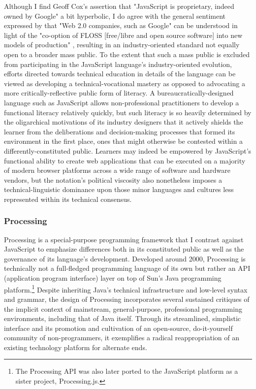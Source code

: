 Although I find Geoff Cox's assertion that "JavaScript is proprietary, indeed owned by Google" \autocite*[83]{Cox2012} a bit hyperbolic, I do agree with the general sentiment expressed by \citeauthor{Berry2008} that "Web 2.0 companies, such as Google" can be understood in light of the "co-option of FLOSS [free/libre and open source software] into new models of production" \autocite[xiii]{Berry2008}, resulting in an industry-oriented standard not equally open to a broader mass public. To the extent that such a mass public is excluded from participating in the JavaScript language's industry-oriented evolution, efforts directed towards technical education in details of the language can be viewed as developing a technical-vocational mastery as opposed to advocating a more critically-reflective public form of literacy. A bureaucratically-designed language such as JavaScript allows non-professional practitioners to develop a functional literacy relatively quickly, but such literacy is so heavily determined by the oligarchical motivations of its industry designers that it actively shields the learner from the deliberations and decision-making processes that formed its environment in the first place, ones that might otherwise be contested within a differently-constituted public. Learners may indeed be empowered by JavaScript's functional ability to create web applications that can be executed on a majority of modern browser platforms across a wide range of software and hardware vendors, but the notation's political viscosity also nonetheless imposes a technical-linguistic dominance upon those minor languages and cultures less represented within its technical consensus.

\subsubsection*{Processing}
Processing is a special-purpose programming framework that I contrast against JavaScript to emphasize differences both in its constituted public as well as the governance of its language's development. Developed around 2000, Processing is technically not a full-fledged programming language of its own but rather an API (application program interface) layer on top of Sun's Java programming platform.\footnote{
  The Processing API was also later ported to the JavaScript platform as a sister project, Processing.js.
}
Despite inheriting Java's technical infrastructure and low-level syntax and grammar, the design of Processing incorporates several sustained critiques of the implicit context of mainstream, general-purpose, professional programming environments, including that of Java itself. Through its streamlined, simplistic interface and its promotion and cultivation of an open-source, do-it-yourself community of non-programmers, it exemplifies a radical reappropriation of an existing technology platform for alternate ends.

